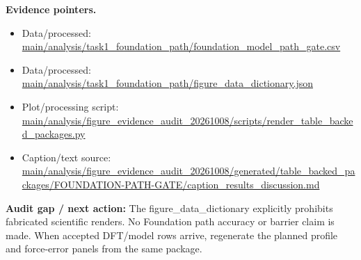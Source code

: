 \documentclass[10pt]{article}
\newcommand{\statusline}[1]{\colorbox{gray!12}{\parbox{0.96\linewidth}{#1}}}
\begin{document}
\textbf{Evidence pointers.}
\begin{itemize}[leftmargin=1.4em,noitemsep]
\item Data/processed: \begingroup\scriptsize\url{main/analysis/task1_foundation_path/foundation_model_path_gate.csv}\endgroup
\item Data/processed: \begingroup\scriptsize\url{main/analysis/task1_foundation_path/figure_data_dictionary.json}\endgroup
\item Plot/processing script: \begingroup\scriptsize\url{main/analysis/figure_evidence_audit_20261008/scripts/render_table_backed_packages.py}\endgroup
\item Caption/text source: \begingroup\scriptsize\url{main/analysis/figure_evidence_audit_20261008/generated/table_backed_packages/FOUNDATION-PATH-GATE/caption_results_discussion.md}\endgroup
\end{itemize}
\statusline{\textbf{Audit gap / next action:} The figure\_data\_dictionary explicitly prohibits fabricated scientific renders. No Foundation path accuracy or barrier claim is made. When accepted DFT/model rows arrive, regenerate the planned profile and force-error panels from the same package.}
\vfill
\clearpage
\end{document}
